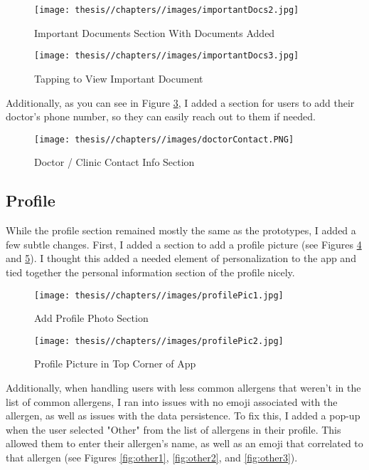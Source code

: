 \begin{figure} [H]
    \centering
    \texttt{[image: thesis//chapters//images/importantDocs2.jpg]}
    \caption{Important Documents Section With Documents Added}
      \label{fig:importantdocs2}
\end{figure}

\begin{figure} [H]
    \centering
    \texttt{[image: thesis//chapters//images/importantDocs3.jpg]}
    \caption{Tapping to View Important Document}
      \label{fig:importantdocs3}
\end{figure}

Additionally, as you can see in Figure \ref{fig:doctorcontact}, I added a section for users to add their doctor's phone number, so they can easily reach out to them if needed.

\begin{figure} [H]
    \centering
    \texttt{[image: thesis//chapters//images/doctorContact.PNG]}
    \caption{Doctor / Clinic Contact Info Section}
       \label{fig:doctorcontact}
\end{figure}

\subsection{Profile}

While the profile section remained mostly the same as the prototypes, I added a few subtle changes. First, I added a section to add a profile picture (see Figures \ref{fig:profile} and \ref{fig:profile2}). I thought this added a needed element of personalization to the app and tied together the personal information section of the profile nicely.

\begin{figure} [H]
    \centering
    \texttt{[image: thesis//chapters//images/profilePic1.jpg]}
    \caption{Add Profile Photo Section}
        \label{fig:profile}
\end{figure}

\begin{figure} [H]
    \centering
    \texttt{[image: thesis//chapters//images/profilePic2.jpg]}
    \caption{Profile Picture in Top Corner of App}
    \label{fig:profile2}
\end{figure}

Additionally, when handling users with less common allergens that weren't in the list of common allergens, I ran into issues with no emoji associated with the allergen, as well as issues with the data persistence. To fix this, I added a pop-up when the user selected "Other" from the list of allergens in their profile. This allowed them to enter their allergen's name, as well as an emoji that correlated to that allergen (see Figures \ref{fig:other1}, \ref{fig:other2}, and \ref{fig:other3}).

